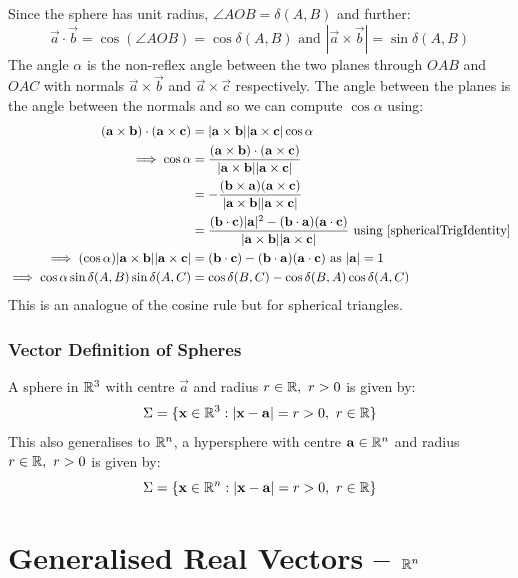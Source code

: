\documentclass[../main.tex]{subfiles}
\begin{document}
Since the sphere has unit radius, $\angle AOB = \delta(A, B)$ and further:
\[
  \vec{a} \cdot \vec{b} = \cos (\angle AOB) = \cos \delta(A, B) \text{ and } |\vec{a} \times \vec{b}| = \sin \delta(A, B)
\]
The angle $\alpha$ is the non-reflex angle between the two planes through $OAB$ and $OAC$ with normals $\vec{a} \times \vec{b}$ and $\vec{a} \times \vec{c}$ respectively.
The angle between the planes is the angle between the normals and so we can compute $\cos \alpha$ using:
\begin{align*}
  (\vec{a} \times \vec{b}) \cdot (\vec{a} \times \vec{c}) &= |\vec{a} \times \vec{b}||\vec{a} \times \vec{c}|\cos \alpha \\
  \implies \cos \alpha &= \frac{(\vec{a} \times \vec{b}) \cdot (\vec{a} \times \vec{c})}{|\vec{a} \times \vec{b}| |\vec{a} \times \vec{c}|} \\
               &= - \frac{(\vec{b} \times \vec{a})(\vec{a} \times \vec{c})}{|\vec{a} \times \vec{b}||\vec{a} \times \vec{c}|} \\
               &= \frac{(\vec{b} \cdot \vec{c})|\vec{a}|^2 - (\vec{b} \cdot \vec{a})(\vec{a} \cdot \vec{c})}{|\vec{a} \times \vec{b}||\vec{a} \times \vec{c}|} \text{ using \cref{sphericalTrigIdentity}} \\
  \implies (\cos \alpha)|\vec{a} \times \vec{b}||\vec{a} \times \vec{c}| &= (\vec{b} \cdot \vec{c}) - (\vec{b} \cdot \vec{a})(\vec{a} \cdot \vec{c}) \text{ as $|\vec{a}| = 1$} \\
  \implies \cos \alpha \sin \delta(A, B) \sin \delta(A, C) &= \cos \delta(B, C) - \cos \delta(B, A) \cos \delta(A, C)
\end{align*}
This is an analogue of the cosine rule but for spherical triangles.

\subsubsection{Vector Definition of Spheres}
A sphere in $\mathbb{R}^3$ with centre $\vec{a}$ and radius $r \in \mathbb{R},\ r > 0$ is given by:
\[
  \Sigma=\{\mathbf{\bm{x}} \in \mathbb{R}^3 : |\mathbf{\bm{x}} - \mathbf{\bm{a}}| = r > 0,\ r \in \mathbb{R}\}
\]
This also generalises to $\mathbb{R}^{n}$, a hypersphere with centre $\mathbf{\bm{a}} \in \mathbb{R}^{n}$ and radius $r \in \mathbb{R},\ r > 0$ is given by:
\[
  \Sigma =\{\mathbf{\bm{x}} \in \mathbb{R}^{n} : |\mathbf{\bm{x}} - \mathbf{\bm{a}}| = r > 0,\ r \in \mathbb{R}\}
\]
\section{Generalised Real Vectors\texorpdfstring{ -- $\mathbb{R}^{n}$}{}}
\label{generalisedReal}
\end{document}
